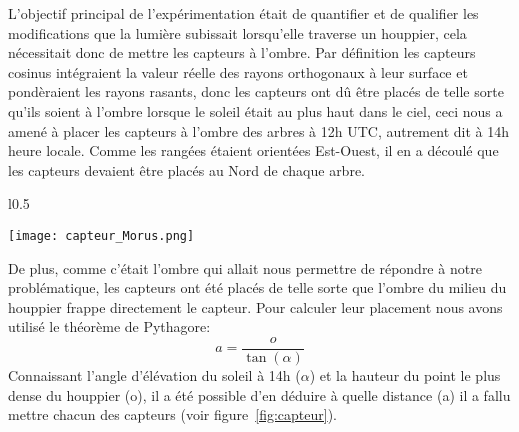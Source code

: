 ﻿\documentclass[12pt]{report}
\begin{document}

L'objectif principal de l'expérimentation était de quantifier et de qualifier les
modifications que la lumière subissait lorsqu'elle traverse un houppier, cela
nécessitait donc de mettre les capteurs à l'ombre. Par définition les capteurs cosinus
intégraient la valeur réelle des rayons orthogonaux à leur surface et pondèraient
les rayons rasants, donc les capteurs ont dû être placés de
telle sorte qu'ils soient à l'ombre lorsque le soleil était au plus haut dans le
ciel, ceci nous a amené à placer les capteurs à l'ombre des arbres à 12h UTC,
autrement dit à 14h heure locale. Comme les rangées étaient orientées Est-Ouest,
il en a découlé que les capteurs devaient être placés au Nord de chaque arbre.


\begin{wrapfigure}{l}{0.5\textwidth}
  \vspace{-20pt}
  \begin{center}
    \texttt{[image: capteur\_Morus.png]}
  \end{center}
  \caption{Photographie d'un capteur sous un \textit{M. alba}\label{fig:capteur}}
\end{wrapfigure}


De plus, comme c'était l'ombre qui allait nous permettre de répondre à
notre problématique, les capteurs ont
été placés de telle sorte que l'ombre du milieu du houppier frappe directement
le capteur. Pour calculer leur placement nous avons utilisé le théorème de
Pythagore:
\[
    a = \frac{o}{\tan(\alpha)}
\]
Connaissant l'angle d'élévation du soleil à 14h ($\alpha$) et la hauteur du
point le plus dense du houppier (o), il a été possible d'en déduire à quelle
distance (a) il a fallu mettre chacun des capteurs (voir figure~\ref{fig:capteur}).
\end{document}
